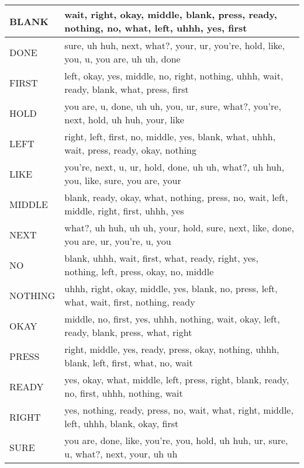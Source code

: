 \documentclass[]{article}
\begin{document}
\begin{tabular}{|l|l|}	
\hline \rule[-2ex]{0pt}{5.5ex}  BLANK	& wait, right, okay, middle, blank, press, ready, nothing, no, what, left, uhhh, yes, first \\
\hline \rule[-2ex]{0pt}{5.5ex}  DONE	& sure, uh huh, next, what?, your, ur, you're, hold, like, you, u, you are, uh uh, done \\
\hline \rule[-2ex]{0pt}{5.5ex}  FIRST	& left, okay, yes, middle, no, right, nothing, uhhh, wait, ready, blank, what, press, first \\
\hline \rule[-2ex]{0pt}{5.5ex}  HOLD	& you are, u, done, uh uh, you, ur, sure, what?, you're, next, hold, uh huh, your, like \\
\hline \rule[-2ex]{0pt}{5.5ex}  LEFT	& right, left, first, no, middle, yes, blank, what, uhhh, wait, press, ready, okay, nothing \\
\hline \rule[-2ex]{0pt}{5.5ex}  LIKE	& you're, next, u, ur, hold, done, uh uh, what?, uh huh, you, like, sure, you are, your \\
\hline \rule[-2ex]{0pt}{5.5ex}  MIDDLE	& blank, ready, okay, what, nothing, press, no, wait, left, middle, right, first, uhhh, yes \\
\hline \rule[-2ex]{0pt}{5.5ex}  NEXT	& what?, uh huh, uh uh, your, hold, sure, next, like, done, you are, ur, you're, u, you \\
\hline \rule[-2ex]{0pt}{5.5ex}  NO		& blank, uhhh, wait, first, what, ready, right, yes, nothing, left, press, okay, no, middle \\
\hline \rule[-2ex]{0pt}{5.5ex}  NOTHING	& uhhh, right, okay, middle, yes, blank, no, press, left, what, wait, first, nothing, ready \\
\hline \rule[-2ex]{0pt}{5.5ex}  OKAY	& middle, no, first, yes, uhhh, nothing, wait, okay, left, ready, blank, press, what, right \\
\hline \rule[-2ex]{0pt}{5.5ex}  PRESS	& right, middle, yes, ready, press, okay, nothing, uhhh, blank, left, first, what, no, wait \\
\hline \rule[-2ex]{0pt}{5.5ex}  READY	& yes, okay, what, middle, left, press, right, blank, ready, no, first, uhhh, nothing, wait \\
\hline \rule[-2ex]{0pt}{5.5ex}  RIGHT	& yes, nothing, ready, press, no, wait, what, right, middle, left, uhhh, blank, okay, first \\
\hline \rule[-2ex]{0pt}{5.5ex}  SURE	& you are, done, like, you're, you, hold, uh huh, ur, sure, u, what?, next, your, uh uh \\

\end{tabular}
\end{document}
